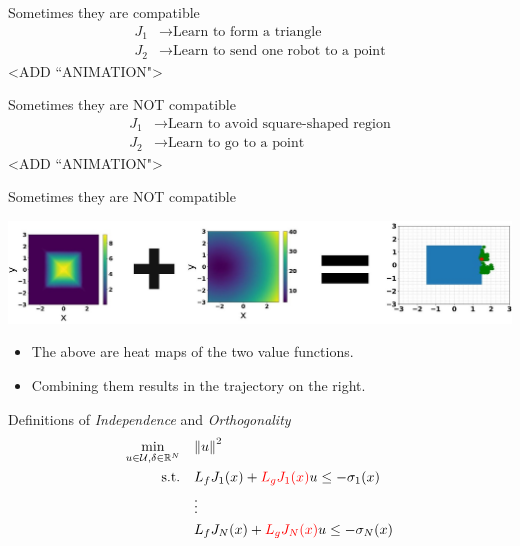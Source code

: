 \begin{frame}{Sometimes they are compatible}
	\begin{align*}
		{J}_1 &\rightarrow \textrm{Learn to form a triangle} \\
		{J}_2 &\rightarrow \textrm{Learn to send one robot to a point}
	\end{align*}
	<ADD ``ANIMATION">
\end{frame}

\begin{frame}{Sometimes they are NOT compatible}
	\begin{align*}
		{J}_1 &\rightarrow \textrm{Learn to avoid square-shaped region} \\
		{J}_2 &\rightarrow \textrm{Learn to go to a point}
	\end{align*}
	<ADD ``ANIMATION">
\end{frame}

\begin{frame}{Sometimes they are NOT compatible}
	\begin{minipage}{\textwidth}
		\centering		
		\includegraphics[width=1.\linewidth]{diagramMath}
	\end{minipage}%
	\seprule
	\begin{itemize}
		\item{The above are heat maps of the two value functions.}
		\item{Combining them results in the trajectory on the right.}
	\end{itemize}
\end{frame}

\begin{frame}{Definitions of \textit{Independence} and \textit{Orthogonality}}
	\begin{align*}
		\min_{u \in \mathcal{U}, \delta \in \mathbb{R}^N} \quad & { \lVert u \rVert }^2 \\
		\textrm{s.t.} \quad & L_f {J}_1 (x) + { \color{red} L_g {J}_1 (x) } u \le - \sigma_1(x) \\
                \quad & \vdots \\
		\quad & L_f {J}_N (x) + { \color{red} L_g {J}_N (x) } u \le - \sigma_N(x) \\
	\end{align*}
\end{frame}

